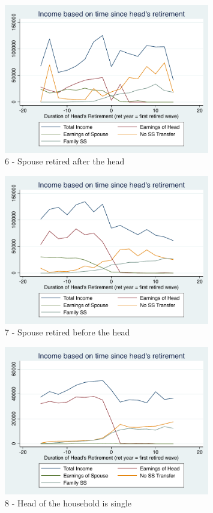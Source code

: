 \documentclass[11pt,onecolumn]{article}
\numberwithin{figure}{section}
\begin{document}
\begin{figure}[h]
	\caption{6 - Spouse retired after the head}
	\centering
	\includegraphics[width=0.8\textwidth]{../IncomeAroundRetirement/Income_with_spouse_definition_6.pdf}
\end{figure}

\begin{figure}[h]
	\caption{7 - Spouse retired before the head}
	\centering
	\includegraphics[width=0.8\textwidth]{../IncomeAroundRetirement/Income_with_spouse_definition_7.pdf}
\end{figure}

\begin{figure}[h]
	\caption{8 - Head of the household is single}
	\centering
	\includegraphics[width=0.8\textwidth]{../IncomeAroundRetirement/Income_with_spouse_definition_8.pdf}
\end{figure}
\end{document}
